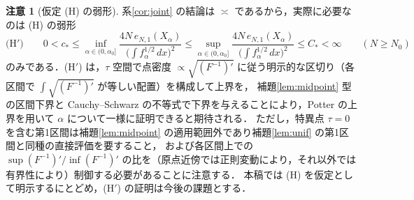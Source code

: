 \documentclass[a4paper,10pt]{jsarticle}
\theoremstyle{definition}
\newtheorem{remark}{注意}[section]
\newcommand{\Finv}{F^{-1}}
\newcommand{\eN}{e_{N,1}}
\begin{document}
\begin{remark}[仮定 (H) の弱形]
\label{rem:weakH}
系\ref{cor:joint} の結論は $\asymp$ であるから，実際に必要なのは (H) の弱形
\begin{equation*}
 \text{(H$'$)}\qquad
 0<c_\ast\le\inf_{\alpha\in(0,\alpha_0]}\frac{4N\,\eN(X_\alpha)}{\bigl(\int f_\alpha^{1/2}\,dx\bigr)^{2}}
 \le\sup_{\alpha\in(0,\alpha_0]}\frac{4N\,\eN(X_\alpha)}{\bigl(\int f_\alpha^{1/2}\,dx\bigr)^{2}}\le C_\ast<\infty
 \qquad(N\ge N_0)
\end{equation*}
のみである．(H$'$) は，$\tau$ 空間で点密度 $\propto\sqrt{(\Finv)'}$ に従う明示的な区切り（各区間で $\int\sqrt{(\Finv)'}$ が等しい配置）を構成して上界を，
補題\ref{lem:midpoint} 型の区間下界と Cauchy--Schwarz の不等式で下界を与えることにより，Potter の上界を用いて $\alpha$ について一様に証明できると期待される．
ただし，特異点 $\tau=0$ を含む第1区間は補題\ref{lem:midpoint} の適用範囲外であり補題\ref{lem:unif} の第1区間と同種の直接評価を要すること，
および各区間上での $\sup(\Finv)'/\inf(\Finv)'$ の比を（原点近傍では正則変動により，それ以外では有界性により）制御する必要があることに注意する．
本稿では (H) を仮定として明示するにとどめ，(H$'$) の証明は今後の課題とする．
\end{remark}
\end{document}

